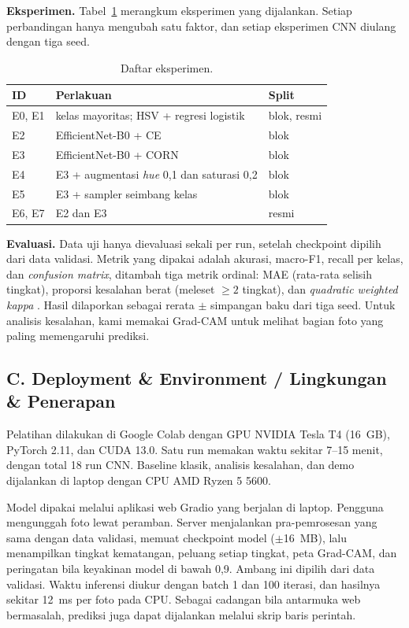 \documentclass[10pt,a4paper,twocolumn]{article}
\begin{document}
\textbf{Eksperimen.} Tabel~\ref{tab:eksperimen} merangkum eksperimen yang dijalankan. Setiap perbandingan hanya mengubah satu faktor, dan setiap eksperimen CNN diulang dengan tiga seed.

\begin{table}[t]
  \centering
  \caption{Daftar eksperimen.}
  \label{tab:eksperimen}
  \footnotesize
  \begin{tabular}{|l|p{4.2cm}|l|}
    \hline
    \textbf{ID} & \textbf{Perlakuan} & \textbf{Split} \\
    \hline
    E0, E1 & kelas mayoritas; HSV + regresi logistik & blok, resmi \\
    E2     & EfficientNet-B0 + CE & blok \\
    E3     & EfficientNet-B0 + CORN & blok \\
    E4     & E3 + augmentasi \emph{hue} 0,1 dan saturasi 0,2 & blok \\
    E5     & E3 + sampler seimbang kelas & blok \\
    E6, E7 & E2 dan E3 & resmi \\
    \hline
  \end{tabular}
\end{table}

\textbf{Evaluasi.} Data uji hanya dievaluasi sekali per run, setelah checkpoint dipilih dari data validasi. Metrik yang dipakai adalah akurasi, macro-F1, recall per kelas, dan \emph{confusion matrix}, ditambah tiga metrik ordinal: MAE (rata-rata selisih tingkat), proporsi kesalahan berat (meleset $\geq 2$ tingkat), dan \emph{quadratic weighted kappa} \cite{cohen1968}. Hasil dilaporkan sebagai rerata $\pm$ simpangan baku dari tiga seed. Untuk analisis kesalahan, kami memakai Grad-CAM \cite{selvaraju2017} untuk melihat bagian foto yang paling memengaruhi prediksi.

\subsection{C. Deployment \& Environment / Lingkungan \& Penerapan}
Pelatihan dilakukan di Google Colab dengan GPU NVIDIA Tesla T4 (16~GB), PyTorch 2.11, dan CUDA 13.0. Satu run memakan waktu sekitar 7--15 menit, dengan total 18 run CNN. Baseline klasik, analisis kesalahan, dan demo dijalankan di laptop dengan CPU AMD Ryzen 5 5600.

Model dipakai melalui aplikasi web Gradio yang berjalan di laptop. Pengguna mengunggah foto lewat peramban. Server menjalankan pra-pemrosesan yang sama dengan data validasi, memuat checkpoint model ($\pm$16~MB), lalu menampilkan tingkat kematangan, peluang setiap tingkat, peta Grad-CAM, dan peringatan bila keyakinan model di bawah 0,9. Ambang ini dipilih dari data validasi. Waktu inferensi diukur dengan batch 1 dan 100 iterasi, dan hasilnya sekitar 12~ms per foto pada CPU. Sebagai cadangan bila antarmuka web bermasalah, prediksi juga dapat dijalankan melalui skrip baris perintah.
\end{document}
